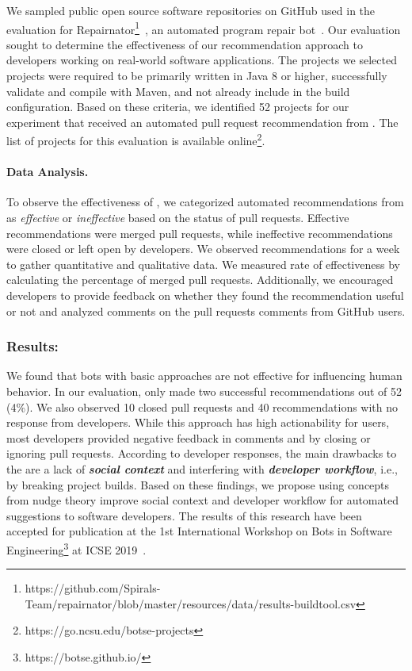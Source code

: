 We sampled public open source software repositories on GitHub used in the evaluation for Repairnator\footnote{https://github.com/Spirals-Team/repairnator/blob/master/resources/data/results-buildtool.csv}~\cite{Repairnator}, an automated program repair bot~\cite{Repairnator}. Our evaluation sought to determine the effectiveness of our \telemarketer recommendation approach to developers working on real-world software applications. The projects we selected projects were required to be primarily written in Java 8 or higher, successfully validate and compile with Maven, and not already include \EP in the build configuration. Based on these criteria, we identified 52 projects for our experiment that received an automated pull request recommendation from \TOOL. The list of projects for this evaluation is available online\footnote{https://go.ncsu.edu/botse-projects}.

\paragraph{Data Analysis.}

To observe the effectiveness of \telemarketer, we categorized automated recommendations from \TOOL as \textit{effective} or \textit{ineffective} based on the status of pull requests. Effective recommendations were merged pull requests, while ineffective recommendations were closed or left open by developers. We observed recommendations for a week to gather quantitative and qualitative data. We measured rate of effectiveness by calculating the percentage of merged pull requests. Additionally, we encouraged developers to provide feedback on whether they found the recommendation useful or not and analyzed comments on the pull requests comments from GitHub users. 

\subsubsection{Results:} 

We found that bots with basic approaches are not effective for influencing human behavior. In our evaluation, \telemarketer only made two successful recommendations out of 52 (4\%). We also observed 10 closed pull requests and 40 recommendations with no response from developers. While this approach has high actionability for users, most developers provided negative feedback in comments and by closing or ignoring pull requests. According to developer responses, the main drawbacks to the \telemarketer are a lack of \textit{\textbf{social context}} and interfering with \textit{\textbf{developer workflow}}, i.e., by breaking project builds. Based on these findings, we propose using concepts from nudge theory improve social context and developer workflow for automated suggestions to software developers. The results of this research have been accepted for publication at the 1st International Workshop on Bots in Software Engineering\footnote{https://botse.github.io/} at ICSE 2019~\cite{Bots}.

